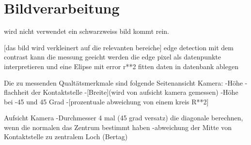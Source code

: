 
\section{Bildverarbeitung}
wird nicht verwendet
ein schwarzweiss bild kommt rein.

[das bild wird verkleinert auf die relevanten bereiche]
edge detection
mit dem contrast kann die messung geeicht werden
die edge pixel als datenpunkte interpretieren und eine Elipse mit error r**2 fitten
daten in datenbank ablegen

Die zu messenden Qualtätsmerkmale sind folgende
Seitenansicht Kamera:
-Höhe
-flachheit der Kontaktstelle
-[Breite](wird von aufsicht kamera gemessen)
-Höhe bei -45 und 45 Grad
-[prozentuale abweichung von einem kreis R**2]

Aufsicht Kamera
-Durchmesser 4 mal (45 grad versatz) die diagonale berechnen, wenn die normalen das Zentrum bestimmt haben
-abweichung der Mitte von Kontaktstelle zu zentralem Loch (Bertag)
